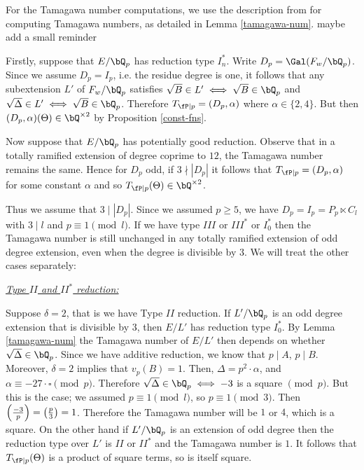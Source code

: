 \vspace{1em}

For the Tamagawa number computations, we use the description from \cite{reg-const} for computing Tamagawa numbers, as detailed in Lemma \ref{tamagawa-num}. {\color{red} maybe add a small reminder}

Firstly, suppose that $E / \bQ_p$ has reduction type $I_{n}^{*}$. 
Write $D_p = \Gal(F_w / \bQ_p)$. Since we assume $D_p = I_p$, i.e. the residue degree is one, it follows that any subextension $L'$ of $F_{w} / \bQ_p$ satisfies $\sqrt{B} \in L' \iff \sqrt{B} \in \bQ_p$ and $\sqrt{\Delta} \in L' \iff \sqrt{B} \in \bQ_p$. 
Therefore $T_{\fP \mid p} = (D_p, \alpha)$ where $\alpha \in \{2, 4\}$. But then $(D_p, \alpha)(\Theta) \in \bQ^{\times 2}$ by Proposition \ref{const-fns}.

Now suppose that $E / \bQ_p$ has potentially good reduction. Observe that in a totally ramified extension of degree coprime to $12$, the Tamagawa number remains the same. Hence for $D_p$ odd, if $3 \nmid |D_p|$ it follows that $T_{\fP \mid p} = (D_p, \alpha)$ for some constant $
\alpha$ and so $T_{\fP \mid p}(\Theta) \in \bQ^{\times 2}$.

Thus we assume that $3 \mid |D_p|$. Since we assumed $p \geq 5$, we have $D_p = I_p = P_p \ltimes C_l$ with $3 \mid l$ and $p \equiv 1 \pmod l$. 
If we have type $III$ or $III^*$ or $I_0^*$ then the Tamagawa number is still unchanged in any totally ramified extension of odd degree extension, even when the degree is divisible by $3$. We will treat the other cases separately: 

\vspace{1em}

\noindent\underline{\textit{Type $II$ and $II^*$ reduction:}}

Suppose $\delta = 2$, that is we have Type $II$ reduction. If $L' / \bQ_p$ is an odd degree extension that is divisible by $3$, then $E / L'$ has reduction type $I_0^*$. By Lemma \ref{tamagawa-num} the Tamagawa number of $E / L'$ then depends on whether $\sqrt{\Delta} \in \bQ_p$. Since we have additive reduction, we know that $p \mid A$, $p \mid B$. Moreover, $\delta = 2$ implies that $v_p(B) = 1$. Then, $\Delta = p^2\cdot \alpha$, and $\alpha \equiv -27\cdot\square \pmod p$. Therefore $\sqrt{\Delta} \in \bQ_p \iff -3$ is a square $\pmod p$. But this is the case; we assumed $p \equiv 1 \pmod l$, so $p \equiv 1 \pmod 3$. Then $\left( \frac{-3}{p} \right)  = \left( \frac{p}{3} \right)  = 1$. Therefore the Tamagawa number will be $1$ or $4$, which is a square.
On the other hand if $L' / \bQ_p$ is an extension of odd degree then the reduction type over $L'$ is $II$ or $II^*$ and the Tamagawa number is $1$. It follows that $T_{\fP \mid p}(\Theta)$ is a product of square terms, so is itself square. 

